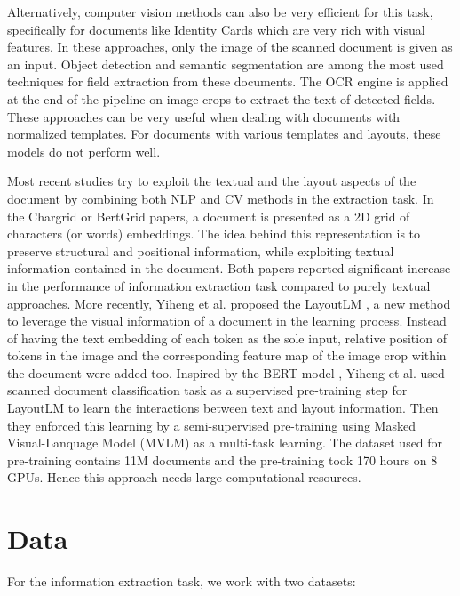 \documentclass[conference]{IEEEtran}
\begin{document}
Alternatively, computer vision methods can also be very efficient for this task, specifically for documents like Identity Cards which are very rich with visual features. In these approaches, only the image of the scanned document is given as an input. Object detection and semantic segmentation are among the most used techniques for field extraction \cite{cnn} from these documents. The OCR engine is applied at the end of the pipeline on image crops to extract the text of detected fields. These approaches can be very useful when dealing with documents with normalized templates. For documents with various templates and layouts, these models do not perform  well. 

Most recent studies try to exploit the textual and the layout aspects of the document by combining both NLP and CV methods in the extraction task. In the Chargrid \cite{chargrid} or BertGrid \cite{bertgrid} papers, a document is presented as a 2D grid of characters (or words) embeddings. The idea behind this representation is to preserve structural and positional information, while exploiting textual information contained in the document. Both papers reported significant increase in the performance of information extraction task compared to purely textual approaches. More recently, Yiheng et al. proposed the LayoutLM \cite{layoutLM}, a new method to leverage the visual information of a document in the learning process. 
Instead of having  the text embedding of each token as the sole input, relative position of tokens in the image and the corresponding feature map of the image crop within the document were added too. Inspired by the BERT model \cite{bert}, Yiheng et al. used  scanned document classification task as a supervised pre-training step for LayoutLM to learn the interactions between text and layout information. Then they enforced this learning by a semi-supervised pre-training using Masked Visual-Lanquage Model (MVLM) as a multi-task learning. The dataset used for pre-training contains 11M documents and the pre-training took 170 hours on 8 GPUs. Hence this approach needs large computational resources.

\section{Data}

For the information extraction task, we work with two datasets:
\end{document}
